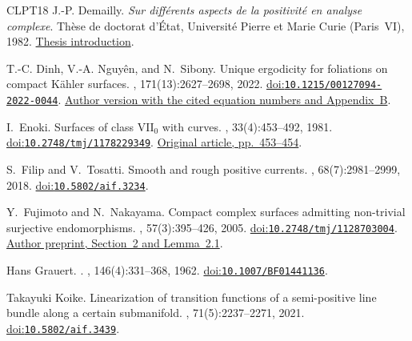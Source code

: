 \documentclass[11pt]{amsart}
\theoremstyle{definition}
\theoremstyle{remark}
\numberwithin{equation}{section}
\begin{document}
\begin{thebibliography}{CLPT18}
J.-P. Demailly.
\newblock \emph{Sur diff\'erents aspects de la positivit\'e en analyse complexe}.
\newblock Th\`ese de doctorat d'\'Etat, Universit\'e Pierre et Marie Curie
(Paris~VI), 1982.
\newblock \href{https://www-fourier.ujf-grenoble.fr/~demailly/manuscripts/these_etat_intro.pdf}{Thesis introduction}.

T.-C. Dinh, V.-A. Nguy\^en, and N.~Sibony.
\newblock Unique ergodicity for foliations on compact {K\"ahler} surfaces.
, 171(13):2627--2698, 2022.
\newblock \href{https://doi.org/10.1215/00127094-2022-0044}{doi:\nolinkurl{10.1215/00127094-2022-0044}}. \href{https://arxiv.org/abs/1811.07450v2}{Author version with the cited equation numbers and Appendix~B}.

I.~Enoki.
\newblock Surfaces of class {$\mathrm{VII}_0$} with curves.
, 33(4):453--492, 1981.
\newblock \href{https://doi.org/10.2748/tmj/1178229349}{doi:\nolinkurl{10.2748/tmj/1178229349}}. \href{https://www.jstage.jst.go.jp/article/tmj1949/33/4/33_4_453/_pdf/-char/en}{Original article, pp.~453--454}.

S.~Filip and V.~Tosatti.
\newblock Smooth and rough positive currents.
, 68(7):2981--2999, 2018.
\newblock \href{https://doi.org/10.5802/aif.3234}{doi:\nolinkurl{10.5802/aif.3234}}.

Y.~Fujimoto and N.~Nakayama.
\newblock Compact complex surfaces admitting non-trivial surjective endomorphisms.
, 57(3):395--426, 2005.
\newblock \href{https://doi.org/10.2748/tmj/1128703004}{doi:\nolinkurl{10.2748/tmj/1128703004}}. \href{https://www.kurims.kyoto-u.ac.jp/preprint/file/RIMS1431.pdf}{Author preprint, Section~2 and Lemma~2.1}.

Hans Grauert.
.
, 146(4):331--368, 1962.
\newblock \href{https://doi.org/10.1007/BF01441136}{doi:\nolinkurl{10.1007/BF01441136}}.

Takayuki Koike.
\newblock Linearization of transition functions of a semi-positive line bundle along a certain submanifold.
, 71(5):2237--2271, 2021.
\newblock \href{https://doi.org/10.5802/aif.3439}{doi:\nolinkurl{10.5802/aif.3439}}.


\end{thebibliography}
\end{document}
